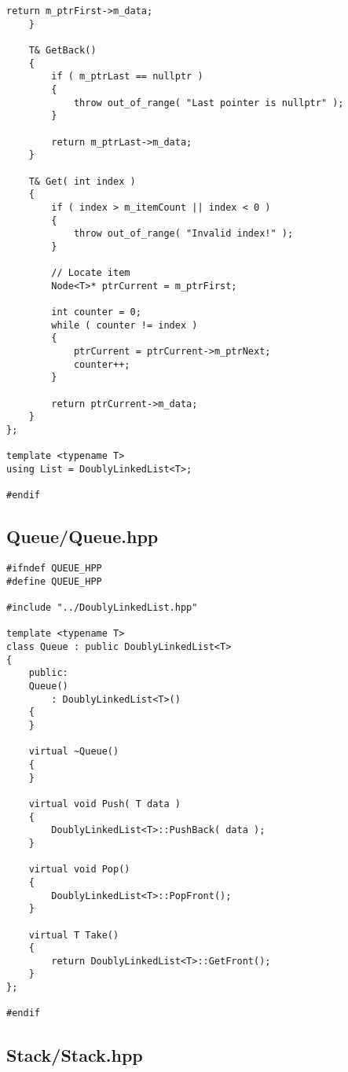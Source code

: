 \documentclass[a4paper,12pt,oneside]{book}
\begin{document}
\begin{lstlisting}[style=code]
        return m_ptrFirst->m_data;
    }

    T& GetBack()
    {
        if ( m_ptrLast == nullptr )
        {
            throw out_of_range( "Last pointer is nullptr" );
        }

        return m_ptrLast->m_data;
    }

    T& Get( int index )
    {
        if ( index > m_itemCount || index < 0 )
        {
            throw out_of_range( "Invalid index!" );
        }

        // Locate item
        Node<T>* ptrCurrent = m_ptrFirst;

        int counter = 0;
        while ( counter != index )
        {
            ptrCurrent = ptrCurrent->m_ptrNext;
            counter++;
        }

        return ptrCurrent->m_data;
    }
};

template <typename T>
using List = DoublyLinkedList<T>;

#endif

\end{lstlisting}

\newpage
\subsection*{Queue/Queue.hpp}

\begin{lstlisting}[style=code]
#ifndef QUEUE_HPP
#define QUEUE_HPP

#include "../DoublyLinkedList.hpp"

template <typename T>
class Queue : public DoublyLinkedList<T>
{
    public:
    Queue()
        : DoublyLinkedList<T>()
    {
    }

    virtual ~Queue()
    {
    }

    virtual void Push( T data )
    {
        DoublyLinkedList<T>::PushBack( data );
    }

    virtual void Pop()
    {
        DoublyLinkedList<T>::PopFront();
    }

    virtual T Take()
    {
        return DoublyLinkedList<T>::GetFront();
    }
};

#endif

\end{lstlisting}

\newpage
\subsection*{Stack/Stack.hpp}
\end{document}
